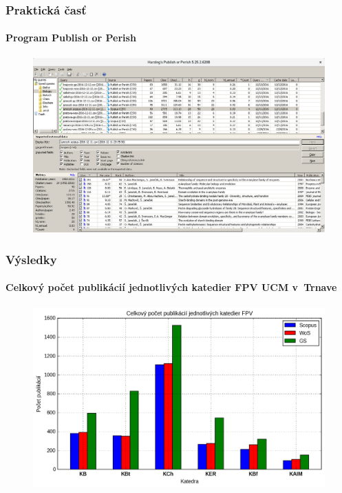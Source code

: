 \documentclass{beamer}
\begin{document}
\begin{frame}
  \frametitle{Praktická časť}
  \framesubtitle{Program Publish or Perish}
  \begin{figure}
    \centering
    \includegraphics[scale=0.25]{publish-or-perish_wine.png}
    \caption{\citet{Harzing2011}}
  \end{figure}
\end{frame}

\begin{frame}
  \frametitle{Výsledky}
  \framesubtitle{Celkový počet publikácií jednotlivých katedier FPV UCM v~Trnave}
  \begin{figure}
    \centering
    \includegraphics[scale=0.5]{plot-results-data-papers.png}
  \end{figure}
\end{frame}
\end{document}
